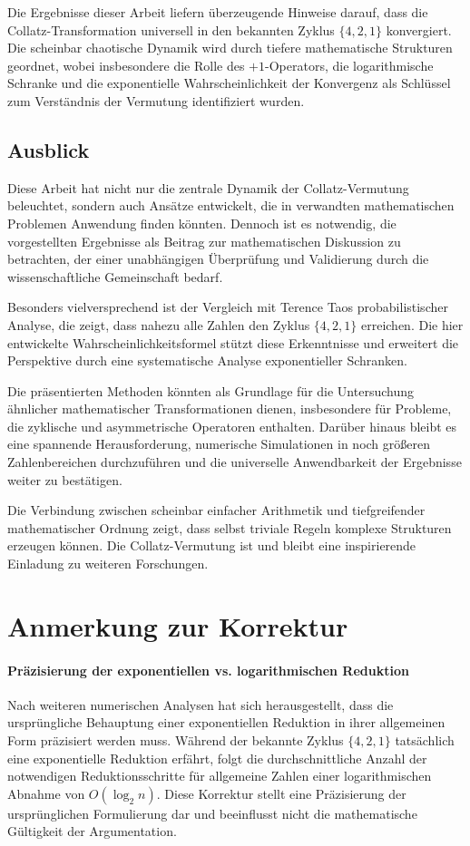 \documentclass[a4paper,12pt]{article}
\begin{document}
Die Ergebnisse dieser Arbeit liefern überzeugende Hinweise darauf, dass die Collatz-Transformation universell in den bekannten Zyklus \( \{4, 2, 1\} \) konvergiert. Die scheinbar chaotische Dynamik wird durch tiefere mathematische Strukturen geordnet, wobei insbesondere die Rolle des \(+1\)-Operators, die logarithmische Schranke und die exponentielle Wahrscheinlichkeit der Konvergenz als Schlüssel zum Verständnis der Vermutung identifiziert wurden.

\subsection{Ausblick}
Diese Arbeit hat nicht nur die zentrale Dynamik der Collatz-Vermutung beleuchtet, sondern auch Ansätze entwickelt, die in verwandten mathematischen Problemen Anwendung finden könnten. Dennoch ist es notwendig, die vorgestellten Ergebnisse als Beitrag zur mathematischen Diskussion zu betrachten, der einer unabhängigen Überprüfung und Validierung durch die wissenschaftliche Gemeinschaft bedarf.

Besonders vielversprechend ist der Vergleich mit Terence Taos probabilistischer Analyse, die zeigt, dass nahezu alle Zahlen den Zyklus \( \{4,2,1\} \) erreichen. Die hier entwickelte Wahrscheinlichkeitsformel stützt diese Erkenntnisse und erweitert die Perspektive durch eine systematische Analyse exponentieller Schranken.

Die präsentierten Methoden könnten als Grundlage für die Untersuchung ähnlicher mathematischer Transformationen dienen, insbesondere für Probleme, die zyklische und asymmetrische Operatoren enthalten. Darüber hinaus bleibt es eine spannende Herausforderung, numerische Simulationen in noch größeren Zahlenbereichen durchzuführen und die universelle Anwendbarkeit der Ergebnisse weiter zu bestätigen.

Die Verbindung zwischen scheinbar einfacher Arithmetik und tiefgreifender mathematischer Ordnung zeigt, dass selbst triviale Regeln komplexe Strukturen erzeugen können. Die Collatz-Vermutung ist und bleibt eine inspirierende Einladung zu weiteren Forschungen.


\section*{Anmerkung zur Korrektur}  

\paragraph{Präzisierung der exponentiellen vs. logarithmischen Reduktion}  
Nach weiteren numerischen Analysen hat sich herausgestellt, dass die ursprüngliche Behauptung einer exponentiellen Reduktion in ihrer allgemeinen Form präzisiert werden muss. Während der bekannte Zyklus \( \{4,2,1\} \) tatsächlich eine exponentielle Reduktion erfährt, folgt die durchschnittliche Anzahl der notwendigen Reduktionsschritte für allgemeine Zahlen einer logarithmischen Abnahme von \( O(\log_2 n) \). Diese Korrektur stellt eine Präzisierung der ursprünglichen Formulierung dar und beeinflusst nicht die mathematische Gültigkeit der Argumentation.
\end{document}
